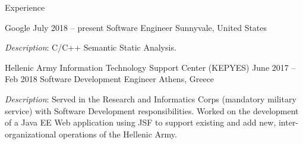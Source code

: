 \documentclass{resume}
\begin{document}
\newcommand{\mytilde}{\raise.17ex\hbox{$\scriptstyle\mathtt{\sim}$}}



\begin{rSection}{Experience}

\begin{rSubsection}
  {Google}
  {July 2018 -- present}
  {Software Engineer}
  {Sunnyvale, United States}
\item \emph{Description}: C/C++ Semantic Static Analysis.
\end{rSubsection}

\begin{rSubsection}
  {Hellenic Army Information Technology Support Center (KEPYES)}
  {June 2017 -- Feb 2018}
  {Software Development Engineer}
  {Athens, Greece}
\item \emph{Description}: Served in the Research and Informatics Corps
  (mandatory military service) with Software Development
  responsibilities. Worked on the development of a Java EE Web
  application using JSF to support existing and add new,
  inter-organizational operations of the Hellenic Army.
\end{rSubsection}



\end{rSection}
\end{document}
